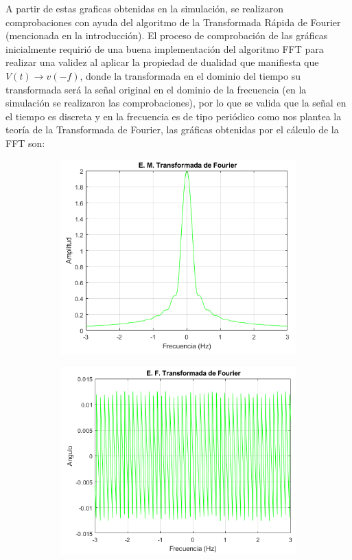 \documentclass[11pt,letterpaper,twocolumn]{article}
\begin{document}
    A partir de estas graficas obtenidas en la simulación, se realizaron comprobaciones con 
    ayuda del algoritmo de la Transformada Rápida de Fourier (mencionada en la introducción). 
    El proceso de comprobación de las gráficas inicialmente requirió de una buena implementación
    del algoritmo FFT para realizar una validez al aplicar la propiedad de dualidad que
    manifiesta que $V(t)\rightarrow v(-f)$, donde la transformada en el dominio del tiempo su transformada
    será la señal original en el dominio de la frecuencia (en la simulación se realizaron las
    comprobaciones),  por lo que se valida que la señal en el tiempo es discreta y en la 
    frecuencia es de tipo periódico como nos plantea la teoría de la Transformada de Fourier,
    las gráficas obtenidas por el cálculo de la FFT son:
    
    \begin{figure}[H]
        \centering 
        \begin{subfigure}[h]{0.49\linewidth}
            \includegraphics[width=\linewidth]{img/EMagnitudTF_FFT.png}
            \label{magnitudFFT}
            \caption{}
        \end{subfigure}
        \begin{subfigure}[h]{0.49\linewidth}
            \includegraphics[width=\linewidth]{img/EFaseTF_FFT.png}

\end{subfigure}
\end{figure}
\end{document}
